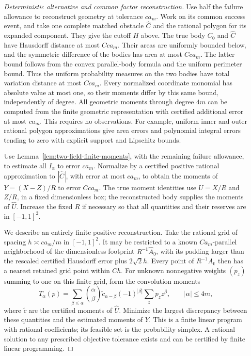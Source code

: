 \begin{proof}[Deterministic alternative and common factor reconstruction]
Use half the failure allowance to reconstruct geometry at tolerance
$c a_m$.  Work on its common success event, and take one complete
matched obstacle $\widehat C$ and the rational polygon for its
expanded component.  They give the cutoff $H$ above.  The true body
$C_0$ and $\widehat C$ have Hausdorff distance at most $C c a_m$.
Their areas are uniformly bounded below, and the symmetric
difference of the bodies has area at most $C c a_m$.  The latter
bound follows from the convex parallel-body formula and the uniform
perimeter bound.  Thus the uniform probability measures on the two
bodies have total variation distance at most $C c a_m$.
Every normalized coordinate monomial has absolute value at most one,
so their moments differ by this same bound, independently of degree.
All geometric moments through degree $4m$ can be computed from the
finite geometric representation with certified additional error at
most $c a_m$.  This requires no observations.  For example, uniform
inner and outer rational polygon approximations give area errors and
polynomial integral errors tending to zero with explicit support and
Lipschitz bounds.

Use Lemma~\ref{lem:two-field-finite-moments}, with the remaining
failure allowance, to estimate all $I_\alpha$ to error $c a_m$.
Normalize by a certified positive rational approximation to
$|\widehat C|$, with error at most $c a_m$, to obtain the moments
of $Y=(X-Z)/R$ to error $C c a_m$.  The true moment identities use
$U=X/R$ and $Z/R$, in a fixed dimensionless box; the reconstructed
body supplies the moments of $\widehat U$.  Increase the fixed $R$
if necessary so that all quantities and their reserves are in
$[-1,1]^2$.

We describe an entirely finite positive reconstruction.  Take the
rational grid of spacing $h\asymp c a_m/m$ in $[-1,1]^2$.  It may
be restricted to a known $Ca_m$-parallel neighborhood of the
dimensionless footprint $R^{-1}\widehat A_0$, with its padding larger
than the rescaled certified Hausdorff error plus $2\sqrt2h$. Every
point of $R^{-1}A_0$ then has a nearest retained grid point within $Ch$.  For unknown
nonnegative weights $(p_z)$ summing to one on this finite grid,
form the convolution moments
\[
 T_\alpha(p)=\sum_{\beta\le\alpha}\binom{\alpha}{\beta}
       \widetilde c_{\alpha-\beta}(-1)^{|\beta|}
                         \sum_zp_z z^\beta,
                       \qquad |\alpha|\le4m,
\]
where $\widetilde c$ are the certified moments of $\widehat U$.
Minimize the largest discrepancy between these quantities and the
estimated moments of $Y$.  This is a finite linear program with
rational coefficients; its feasible set is the probability simplex.
A rational solution to any prescribed objective tolerance exists
and can be certified by finite linear programming.


\end{proof}

